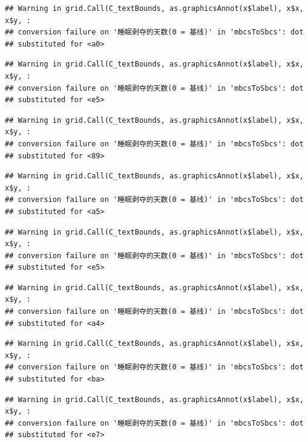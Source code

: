 \documentclass[
]{book}
\begin{document}
\begin{verbatim}
## Warning in grid.Call(C_textBounds, as.graphicsAnnot(x$label), x$x, x$y, :
## conversion failure on '睡眠剥夺的天数(0 = 基线)' in 'mbcsToSbcs': dot
## substituted for <a0>
\end{verbatim}

\begin{verbatim}
## Warning in grid.Call(C_textBounds, as.graphicsAnnot(x$label), x$x, x$y, :
## conversion failure on '睡眠剥夺的天数(0 = 基线)' in 'mbcsToSbcs': dot
## substituted for <e5>
\end{verbatim}

\begin{verbatim}
## Warning in grid.Call(C_textBounds, as.graphicsAnnot(x$label), x$x, x$y, :
## conversion failure on '睡眠剥夺的天数(0 = 基线)' in 'mbcsToSbcs': dot
## substituted for <89>
\end{verbatim}

\begin{verbatim}
## Warning in grid.Call(C_textBounds, as.graphicsAnnot(x$label), x$x, x$y, :
## conversion failure on '睡眠剥夺的天数(0 = 基线)' in 'mbcsToSbcs': dot
## substituted for <a5>
\end{verbatim}

\begin{verbatim}
## Warning in grid.Call(C_textBounds, as.graphicsAnnot(x$label), x$x, x$y, :
## conversion failure on '睡眠剥夺的天数(0 = 基线)' in 'mbcsToSbcs': dot
## substituted for <e5>
\end{verbatim}

\begin{verbatim}
## Warning in grid.Call(C_textBounds, as.graphicsAnnot(x$label), x$x, x$y, :
## conversion failure on '睡眠剥夺的天数(0 = 基线)' in 'mbcsToSbcs': dot
## substituted for <a4>
\end{verbatim}

\begin{verbatim}
## Warning in grid.Call(C_textBounds, as.graphicsAnnot(x$label), x$x, x$y, :
## conversion failure on '睡眠剥夺的天数(0 = 基线)' in 'mbcsToSbcs': dot
## substituted for <ba>
\end{verbatim}

\begin{verbatim}
## Warning in grid.Call(C_textBounds, as.graphicsAnnot(x$label), x$x, x$y, :
## conversion failure on '睡眠剥夺的天数(0 = 基线)' in 'mbcsToSbcs': dot
## substituted for <e7>
\end{verbatim}
\end{document}
